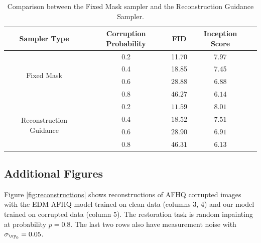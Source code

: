 \documentclass{article}
\begin{document}
\begin{table}[!htp]
    \centering
    \begin{tabular}{@{}ccccc@{}}
    \toprule
    \textbf{Sampler Type} & \textbf{Corruption Probability} & \textbf{FID} & \textbf{Inception Score} 
    \\ \midrule
    \multirow{4}{*}{Fixed Mask} & 0.2 & 11.70 & 7.97 
    \\
    & 0.4 &  18.85 & 7.45 
    \\
    & 0.6 & $\bm{28.88}$ & 6.88 
    \\
    & 0.8 & $\bm{46.27}$ & $\bm{6.14}$  
    \\ \midrule[1pt]
    \multirow{4}{*}{Reconstruction Guidance} & 0.2 & $\bm{11.59}$ & $\bm{8.01}$
    \\
    & 0.4 & $\bm{18.52}$ & $\bm{7.51}$
    \\
    & 0.6 & $28.90$ & $\bm{6.91}$
    \\
    & 0.8 & $46.31$ & $6.13$ \\ \bottomrule
    \end{tabular}
    \vspace{1em}
    \caption{Comparison between the Fixed Mask sampler and the Reconstruction Guidance Sampler.}
    \label{tab:sampling_comparison}
\end{table}        





\subsection{Additional Figures}

Figure \ref{fig:reconstructions} shows reconstructions of AFHQ corrupted images with the EDM AFHQ model trained on clean data (columns 3, 4) and our model trained on corrupted data (column 5). The restoration task is random inpainting at probability $p=0.8$. The last two rows also have measurement noise with $\sigma_{\vy_{0}}=0.05$.
\end{document}
